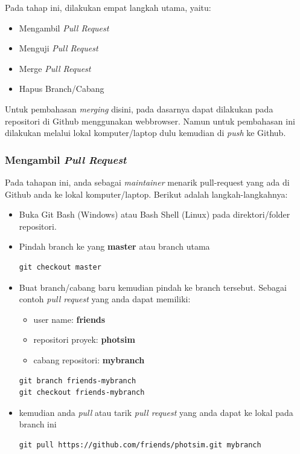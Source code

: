 \documentclass[12pt]{article}
\begin{document}
\newpage
	Pada tahap ini, dilakukan empat langkah utama, yaitu:
	\begin{itemize}
		\item Mengambil \textit{Pull Request}
		\item Menguji \textit{Pull Request}
		\item Merge \textit{Pull Request}
		\item Hapus Branch/Cabang 
	\end{itemize}

	Untuk pembahasan \textit{merging} disini, pada dasarnya dapat dilakukan pada repositori di Github menggunakan webbrowser.
	Namun untuk pembahasan ini dilakukan melalui lokal komputer/laptop dulu kemudian di \textit{push} ke Github.

	\subsubsection{Mengambil \textit{Pull Request}}
	
	Pada tahapan ini, anda sebagai \textit{maintainer} menarik pull-request yang ada di Github anda ke lokal komputer/laptop.
	Berikut adalah langkah-langkahnya:
	
	\begin{itemize}
		\item Buka Git Bash (Windows) atau Bash Shell (Linux) pada direktori/folder repositori.
		
		\item Pindah branch ke yang \textbf{master} atau branch utama
		\begin{verbatim}
git checkout master
		\end{verbatim}
		
		\item Buat branch/cabang baru kemudian pindah ke branch tersebut.
		Sebagai contoh \textit{pull request} yang anda dapat memiliki: 
		\begin{itemize}
			\item user name: \textbf{friends}
			\item repositori proyek: \textbf{photsim}
			\item cabang repositori: \textbf{mybranch}
		\end{itemize}
		\begin{verbatim}
git branch friends-mybranch
git checkout friends-mybranch
		\end{verbatim}
		
		\item kemudian anda \textit{pull} atau tarik \textit{pull request} yang anda dapat ke lokal pada branch ini
		\begin{verbatim}
git pull https://github.com/friends/photsim.git mybranch
		\end{verbatim}
		
	\end{itemize}
	
\end{document}
